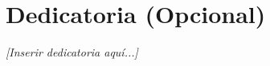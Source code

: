 \chapter*{Dedicatoria (Opcional)}

\vspace*{5cm}
\begin{flushright}
    \textit{[Inserir dedicatoria aquí...]}
\end{flushright}

